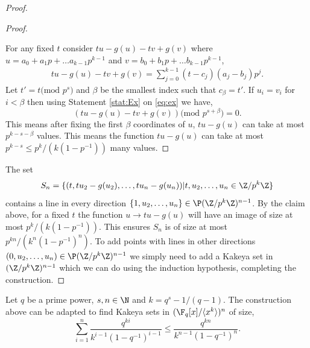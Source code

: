 \begin{proof}
\begin{proof}
\begin{stat}
\end{stat}

For any fixed $t$ consider $tu-g(u)-tv+g(v)$ where $u=a_0+a_1p+\hdots a_{k-1}p^{k-1}$ and $v=b_0+b_1p+\hdots b_{k-1}p^{k-1}$,
\begin{align}\label{eq:ex}
    tu-g(u)-tv+g(v)=\sum\limits_{j=0}^{k-1} (t-c_j)(a_j-b_j)p^j.
\end{align}
Let $t'=t\text{(mod }p^s\text{)}$ and $\beta$ be the smallest index such that $c_\beta=t'$. If $u_i=v_i$ for $i< \beta$ then using Statement \ref{stat:Ex} on \eqref{eq:ex} we have,
$$\left(tu-g(u)-tv+g(v) \right)\text{(mod }p^{s+\beta}\text{)}=0.$$
This means after fixing the first $\beta$ coordinates of $u$, $tu-g(u)$ can take at most $p^{k-s-\beta}$ values. This means the function $tu-g(u)$ can take at most $p^{k-s}\le p^k/(k(1-p^{-1}))$ many values.
\end{proof}
 The set 
$$S_n=\{(t,tu_2-g(u_2),\hdots,tu_n-g(u_n))|t,u_2,\hdots,u_n\in \Z/p^k\Z\}$$
contains a line in every direction $\{1,u_2,\hdots,u_n\}\in \P (\Z/p^k\Z)^{n-1}$. By the claim above, for a fixed $t$ the function $u\rightarrow tu-g(u)$ will have an image of size at most $p^k/(k(1-p^{-1}))$. This ensures $S_n$ is of size at most $p^{kn}/(k^n(1-p^{-1})^n)$. To add points with lines in other directions $(0,u_2,\hdots,u_n)\in \P (\Z/p^k\Z)^{n-1}$ we simply need to add a Kakeya set in $(\Z/p^k\Z)^{n-1}$ which we can do using the induction hypothesis, completing the construction.
\end{proof}
\begin{comm}
Let $q$ be a prime power, $s,n\in \N$ and $k=q^s-1/(q-1)$. The construction above can be adapted to find Kakeya sets in $(\F_q[x]/\langle x^k\rangle)^n$ of size,
$$\sum\limits_{i=1}^n \frac{q^{ki}}{k^{i-1}(1-q^{-1})^{i-1}}\le \frac{q^{kn}}{k^{n-1}(1-q^{-1})^{n}}.$$
\end{comm}
